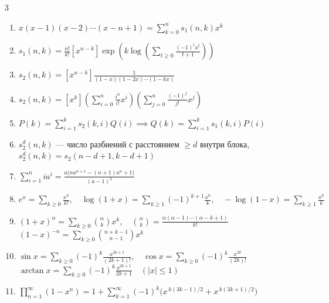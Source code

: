 \documentclass[8pt,a4paper,landscape,twosided]{extarticle}
\begin{document}
\begin{multicols*}{3}
\begin{enumerate}
\item %
$x(x-1)(x-2)\cdots(x-n+1)=\sum_{k=0}^{n}s_1(n,k)x^k$

\item %
$s_1(n,k)=\frac{n!}{k!}[x^{n-k}]
\exp\left(k\log\left(\sum_{t\ge0}\frac{(-1)^t x^t}{t+1}\right)\right)$

\item %
$s_2(n,k)=[x^{n-k}]
\frac{1}{(1-x)(1-2x)\cdots(1-kx)}$

\item %
$s_2(n,k)=[x^k]\left(\sum_{i=0}^{n}\frac{i^n}{i!}x^i\right)
\left(\sum_{j=0}^{n}\frac{(-1)^j}{j!}x^j\right)$

\item %
$P(k)=\sum_{i=1}^{k}s_2(k,i)Q(i)
\implies Q(k)=\sum_{i=1}^{k}s_1(k,i)P(i)$

\item %
$s_2^d(n,k)$ — число разбиений с расстоянием $\ge d$ внутри блока,
$s_2^d(n,k)=s_2(n-d+1,k-d+1)$

\item %
$\sum_{i=1}^n i a^i=\frac{a\bigl(n a^{n+1}-(n+1)a^n+1\bigr)}{(a-1)^2}$

\item %
$\displaystyle e^x=\sum_{k\ge0}\frac{x^k}{k!},\quad
\log(1+x)=\sum_{k\ge1}(-1)^{k+1}\frac{x^k}{k},\quad
-\log(1-x)=\sum_{k\ge1}\frac{x^k}{k}$

\item %
$\displaystyle (1+x)^\alpha=\sum_{k\ge0}\binom{\alpha}{k}x^k,\quad
\binom{\alpha}{k}=\frac{\alpha(\alpha-1)\cdots(\alpha-k+1)}{k!}$
\\ $\displaystyle (1-x)^{-n}=\sum_{k\ge0}\binom{n+k-1}{n-1}x^k$

\item %
$\displaystyle \sin x=\sum_{k\ge0}(-1)^k\frac{x^{2k+1}}{(2k+1)!},\quad
\cos x=\sum_{k\ge0}(-1)^k\frac{x^{2k}}{(2k)!}$
\\ $\displaystyle \arctan x=\sum_{k\ge0}(-1)^k\frac{x^{2k+1}}{2k+1}\quad(|x|\le1)$

\item %
$\prod_{n=1}^\infty(1-x^n)=1+\sum_{k=1}^{\infty}(-1)^k\bigl(x^{\,k(3k-1)/2}+x^{\,k(3k+1)/2}\bigr)$


\end{enumerate}
\end{multicols*}
\end{document}
